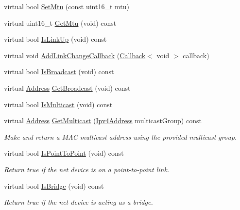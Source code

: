 \begin{DoxyCompactItemize}
\item 
virtual bool \hyperlink{classns3_1_1SimpleNetDevice_ab41676e626a91832291bcfbd55ee454a}{Set\+Mtu} (const uint16\+\_\+t mtu)
\item 
virtual uint16\+\_\+t \hyperlink{classns3_1_1SimpleNetDevice_a6bb1552655bbede11e48a9b434121bab}{Get\+Mtu} (void) const 
\item 
virtual bool \hyperlink{classns3_1_1SimpleNetDevice_a61cee25d8d343244b62e394eedb526af}{Is\+Link\+Up} (void) const 
\item 
virtual void \hyperlink{classns3_1_1SimpleNetDevice_a85b4dd806dece39ff9c3902ed3456b04}{Add\+Link\+Change\+Callback} (\hyperlink{classns3_1_1Callback}{Callback}$<$ void $>$ callback)
\item 
virtual bool \hyperlink{classns3_1_1SimpleNetDevice_a53d2af47f16c3b172be6435f7e2d4976}{Is\+Broadcast} (void) const 
\item 
virtual \hyperlink{classns3_1_1Address}{Address} \hyperlink{classns3_1_1SimpleNetDevice_a50a2dbd27be1d33af97d703908a3ba57}{Get\+Broadcast} (void) const 
\item 
virtual bool \hyperlink{classns3_1_1SimpleNetDevice_a49e6930a1e47be195f99367758ca3537}{Is\+Multicast} (void) const 
\item 
virtual \hyperlink{classns3_1_1Address}{Address} \hyperlink{classns3_1_1SimpleNetDevice_acac0807d0647b4593ae30693ddd16d33}{Get\+Multicast} (\hyperlink{classns3_1_1Ipv4Address}{Ipv4\+Address} multicast\+Group) const 
\begin{DoxyCompactList}\small\item\em Make and return a M\+AC multicast address using the provided multicast group. \end{DoxyCompactList}\item 
virtual bool \hyperlink{classns3_1_1SimpleNetDevice_a2549fed286122c09101730c1a9b2b68a}{Is\+Point\+To\+Point} (void) const 
\begin{DoxyCompactList}\small\item\em Return true if the net device is on a point-\/to-\/point link. \end{DoxyCompactList}\item 
virtual bool \hyperlink{classns3_1_1SimpleNetDevice_ab163b11dc02f9b8561ea279bd27915b9}{Is\+Bridge} (void) const 
\begin{DoxyCompactList}\small\item\em Return true if the net device is acting as a bridge. \end{DoxyCompactList}\item 

\end{DoxyCompactItemize}
